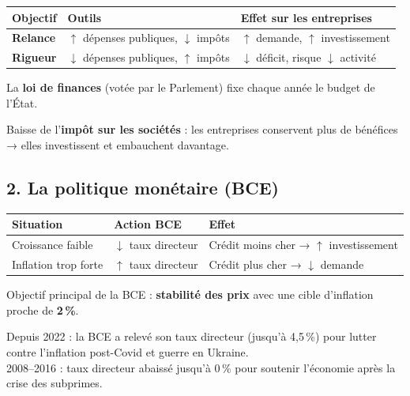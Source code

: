\documentclass[11pt,a4paper]{article}
\begin{document}
\begin{center}
\begin{tabular}{|l|l|l|}
\hline
\textbf{Objectif} & \textbf{Outils} & \textbf{Effet sur les entreprises} \\
\hline
\textbf{Relance} & $\uparrow$ dépenses publiques, $\downarrow$ impôts & $\uparrow$ demande, $\uparrow$ investissement \\
\textbf{Rigueur} & $\downarrow$ dépenses publiques, $\uparrow$ impôts & $\downarrow$ déficit, risque $\downarrow$ activité \\
\hline
\end{tabular}
\end{center}

\begin{keybox}
La \textbf{loi de finances} (votée par le Parlement) fixe chaque année le budget de l'État.
\end{keybox}

\begin{exbox}
Baisse de l'\textbf{impôt sur les sociétés} : les entreprises conservent plus de bénéfices → elles investissent et embauchent davantage.
\end{exbox}

\subsection*{2. La politique monétaire (BCE)}

\begin{center}
\begin{tabular}{|l|l|l|}
\hline
\textbf{Situation} & \textbf{Action BCE} & \textbf{Effet} \\
\hline
Croissance faible & $\downarrow$ taux directeur & Crédit moins cher → $\uparrow$ investissement \\
Inflation trop forte & $\uparrow$ taux directeur & Crédit plus cher → $\downarrow$ demande \\
\hline
\end{tabular}
\end{center}

\begin{keybox}
Objectif principal de la BCE : \textbf{stabilité des prix} avec une cible d'inflation proche de \textbf{2\,\%}.
\end{keybox}

\begin{exbox}
Depuis 2022 : la BCE a relevé son taux directeur (jusqu'à 4,5\,\%) pour lutter contre l'inflation post-Covid et guerre en Ukraine.\\
2008--2016 : taux directeur abaissé jusqu'à 0\,\% pour soutenir l'économie après la crise des subprimes.
\end{exbox}
\end{document}
